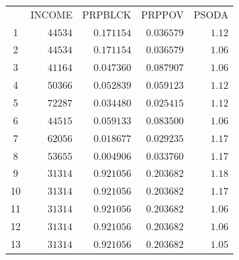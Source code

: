\documentclass[12pt]{report}
\begin{document}
\begin{table}[H]
	\centering
	\begin{tabular}{lrrrr}
		\multicolumn{1}{c}{}&\multicolumn{1}{r}{INCOME}&\multicolumn{1}{r}{PRPBLCK}&\multicolumn{1}{r}{PRPPOV}&\multicolumn{1}{r}{PSODA}\\
		\multicolumn{1}{c}{1}&\multicolumn{1}{r}{$44534$}&\multicolumn{1}{r}{$0.171154$}&\multicolumn{1}{r}{$0.036579$}&\multicolumn{1}{r}{$1.12$}\\
		\multicolumn{1}{c}{2}&\multicolumn{1}{r}{$44534$}&\multicolumn{1}{r}{$0.171154$}&\multicolumn{1}{r}{$0.036579$}&\multicolumn{1}{r}{$1.06$}\\
		\multicolumn{1}{c}{3}&\multicolumn{1}{r}{$41164$}&\multicolumn{1}{r}{$0.047360$}&\multicolumn{1}{r}{$0.087907$}&\multicolumn{1}{r}{$1.06$}\\
		\multicolumn{1}{c}{4}&\multicolumn{1}{r}{$50366$}&\multicolumn{1}{r}{$0.052839$}&\multicolumn{1}{r}{$0.059123$}&\multicolumn{1}{r}{$1.12$}\\
		\multicolumn{1}{c}{5}&\multicolumn{1}{r}{$72287$}&\multicolumn{1}{r}{$0.034480$}&\multicolumn{1}{r}{$0.025415$}&\multicolumn{1}{r}{$1.12$}\\
		\multicolumn{1}{c}{6}&\multicolumn{1}{r}{$44515$}&\multicolumn{1}{r}{$0.059133$}&\multicolumn{1}{r}{$0.083500$}&\multicolumn{1}{r}{$1.06$}\\
		\multicolumn{1}{c}{7}&\multicolumn{1}{r}{$62056$}&\multicolumn{1}{r}{$0.018677$}&\multicolumn{1}{r}{$0.029235$}&\multicolumn{1}{r}{$1.17$}\\
		\multicolumn{1}{c}{8}&\multicolumn{1}{r}{$53655$}&\multicolumn{1}{r}{$0.004906$}&\multicolumn{1}{r}{$0.033760$}&\multicolumn{1}{r}{$1.17$}\\
		\multicolumn{1}{c}{9}&\multicolumn{1}{r}{$31314$}&\multicolumn{1}{r}{$0.921056$}&\multicolumn{1}{r}{$0.203682$}&\multicolumn{1}{r}{$1.18$}\\
		\multicolumn{1}{c}{10}&\multicolumn{1}{r}{$31314$}&\multicolumn{1}{r}{$0.921056$}&\multicolumn{1}{r}{$0.203682$}&\multicolumn{1}{r}{$1.17$}\\
		\multicolumn{1}{c}{11}&\multicolumn{1}{r}{$31314$}&\multicolumn{1}{r}{$0.921056$}&\multicolumn{1}{r}{$0.203682$}&\multicolumn{1}{r}{$1.06$}\\
		\multicolumn{1}{c}{12}&\multicolumn{1}{r}{$31314$}&\multicolumn{1}{r}{$0.921056$}&\multicolumn{1}{r}{$0.203682$}&\multicolumn{1}{r}{$1.06$}\\
		\multicolumn{1}{c}{13}&\multicolumn{1}{r}{$31314$}&\multicolumn{1}{r}{$0.921056$}&\multicolumn{1}{r}{$0.203682$}&\multicolumn{1}{r}{$1.05$}\\

\end{tabular}
\end{table}
\end{document}
